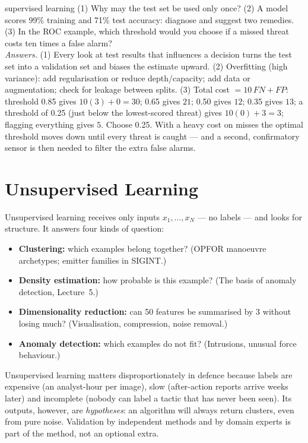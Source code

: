 \documentclass[11pt]{article}
\begin{document}
\begin{question}{supervised learning}
(1) Why may the test set be used only once? (2) A model scores 99\% training and 71\% test accuracy: diagnose and suggest two remedies. (3) In the ROC example, which threshold would you choose if a missed threat costs ten times a false alarm?\\
\textit{Answers.} (1) Every look at test results that influences a decision turns the test set into a validation set and biases the estimate upward. (2) Overfitting (high variance): add regularisation or reduce depth/capacity; add data or augmentation; check for leakage between splits. (3) Total cost $=10\,FN+FP$: threshold 0.85 gives $10(3)+0=30$; 0.65 gives $21$; 0.50 gives $12$; 0.35 gives $13$; a threshold of 0.25 (just below the lowest-scored threat) gives $10(0)+3=3$; flagging everything gives $5$. Choose 0.25. With a heavy cost on misses the optimal threshold moves down until every threat is caught --- and a second, confirmatory sensor is then needed to filter the extra false alarms.
\end{question}

\section{Unsupervised Learning}
Unsupervised learning receives only inputs $x_1,\ldots,x_N$ --- no labels --- and looks for structure. It answers four kinds of question:
\begin{itemize}
\item \textbf{Clustering:} which examples belong together? (OPFOR manoeuvre archetypes; emitter families in SIGINT.)
\item \textbf{Density estimation:} how probable is this example? (The basis of anomaly detection, Lecture~5.)
\item \textbf{Dimensionality reduction:} can 50 features be summarised by 3 without losing much? (Visualisation, compression, noise removal.)
\item \textbf{Anomaly detection:} which examples do not fit? (Intrusions, unusual force behaviour.)
\end{itemize}
Unsupervised learning matters disproportionately in defence because labels are expensive (an analyst-hour per image), slow (after-action reports arrive weeks later) and incomplete (nobody can label a tactic that has never been seen). Its outputs, however, are \emph{hypotheses}: an algorithm will always return clusters, even from pure noise. Validation by independent methods and by domain experts is part of the method, not an optional extra.
\end{document}
